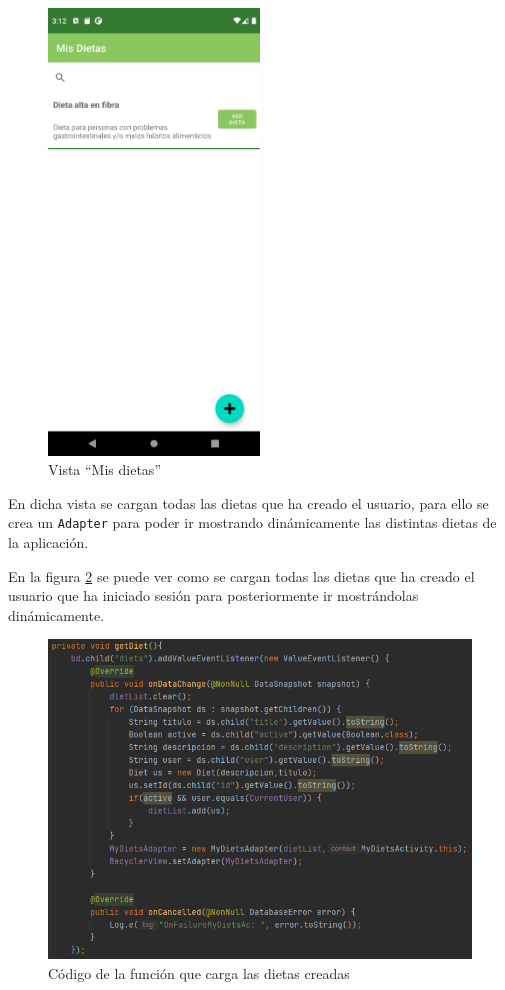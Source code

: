 \begin{figure}[H]
    \centering
    \includegraphics[width=0.5\textwidth]{Images/Capitulo7/misdietas.png}
        \caption{Vista “Mis dietas”}
    \label{fig:misdietas}
\end{figure}

En dicha vista se cargan todas las dietas que ha creado el usuario, para ello se crea un \texttt{Adapter} para poder ir mostrando dinámicamente las distintas dietas de la aplicación.

En la figura \ref{fig:getdietcreate} se puede ver como se cargan todas las dietas que ha creado el usuario que ha iniciado sesión para posteriormente ir mostrándolas dinámicamente.

\begin{figure}[H]
    \centering
    \includegraphics[width=\textwidth]{Images/Capitulo7/getdietcreate.png}
        \caption{Código de la función que carga las dietas creadas}
    \label{fig:getdietcreate}
\end{figure}

